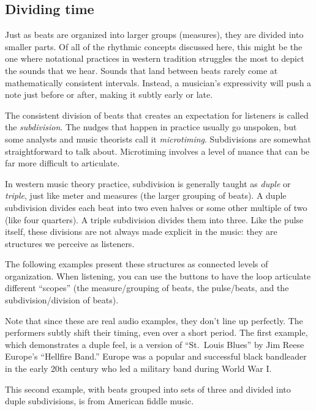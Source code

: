 \documentclass[twoside]{article}
\begin{document}
\hypertarget{example14}{}

\hypertarget{dividing-time}{%
\subsection{Dividing time}\label{dividing-time}}

Just as beats are organized into larger groups (measures), they are
divided into smaller parts. Of all of the rhythmic concepts discussed
here, this might be the one where notational practices in western
tradition struggles the most to depict the sounds that we hear. Sounds
that land between beats rarely come at mathematically consistent
intervals. Instead, a musician's expressivity will push a note just
before or after, making it subtly early or late.

The consistent division of beats that creates an expectation for
listeners is called the \emph{subdivision}. The nudges that happen in
practice usually go unspoken, but some analysts and music theorists call
it \emph{microtiming}. Subdivisions are somewhat straightforward to talk
about. Microtiming involves a level of nuance that can be far more
difficult to articulate.

In western music theory practice, subdivision is generally taught as
\emph{duple} or \emph{triple}, just like meter and measures (the larger
grouping of beats). A duple subdivision divides each beat into two even
halves or some other multiple of two (like four quarters). A triple
subdivision divides them into three. Like the pulse itself, these
divisions are not always made explicit in the music: they are structures
we perceive as listeners.

The following examples present these structures as connected levels of
organization. When listening, you can use the buttons to have the loop
articulate different ``scopes'' (the measure/grouping of beats, the
pulse/beats, and the subdivision/division of beats).

Note that since these are real audio examples, they don't line up
perfectly. The performers subtly shift their timing, even over a short
period. The first example, which demonstrates a duple feel, is a version
of ``St.~Louis Blues'' by Jim Reese Europe's ``Hellfire Band.'' Europe
was a popular and successful black bandleader in the early 20th century
who led a military band during World War I.

\hypertarget{example15}{}

This second example, with beats grouped into sets of three and divided
into duple subdivisions, is from American fiddle music.
\end{document}
